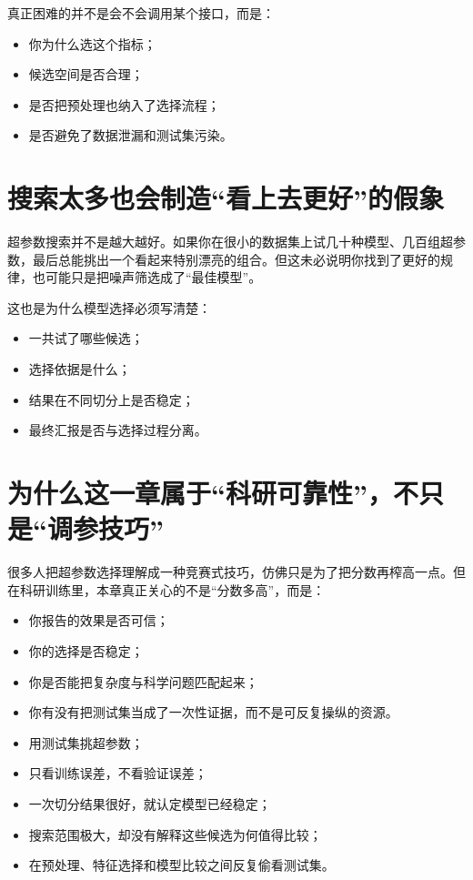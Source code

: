 真正困难的并不是会不会调用某个接口，而是：

\begin{itemize}
    \item 你为什么选这个指标；
    \item 候选空间是否合理；
    \item 是否把预处理也纳入了选择流程；
    \item 是否避免了数据泄漏和测试集污染。
\end{itemize}

\section{搜索太多也会制造“看上去更好”的假象}

超参数搜索并不是越大越好。如果你在很小的数据集上试几十种模型、几百组超参数，最后总能挑出一个看起来特别漂亮的组合。但这未必说明你找到了更好的规律，也可能只是把噪声筛选成了“最佳模型”。

这也是为什么模型选择必须写清楚：

\begin{itemize}
    \item 一共试了哪些候选；
    \item 选择依据是什么；
    \item 结果在不同切分上是否稳定；
    \item 最终汇报是否与选择过程分离。
\end{itemize}

\section{为什么这一章属于“科研可靠性”，不只是“调参技巧”}

很多人把超参数选择理解成一种竞赛式技巧，仿佛只是为了把分数再榨高一点。但在科研训练里，本章真正关心的不是“分数多高”，而是：

\begin{itemize}
    \item 你报告的效果是否可信；
    \item 你的选择是否稳定；
    \item 你是否能把复杂度与科学问题匹配起来；
    \item 你有没有把测试集当成了一次性证据，而不是可反复操纵的资源。
\end{itemize}

\begin{warnbox}[模型选择中的常见误区]
\begin{itemize}
    \item 用测试集挑超参数；
    \item 只看训练误差，不看验证误差；
    \item 一次切分结果很好，就认定模型已经稳定；
    \item 搜索范围极大，却没有解释这些候选为何值得比较；
    \item 在预处理、特征选择和模型比较之间反复偷看测试集。
\end{itemize}
\end{warnbox}

